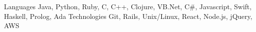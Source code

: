 \begin{cvskills}
  \cvskill
    {Languages}
    {Java, Python, Ruby, C, C++, Clojure, VB.Net, C\#, Javascript, Swift, Haskell, Prolog, Ada}
   \cvskill
    {Technologies}
    {Git, Rails, Unix/Linux, React, Node.js, jQuery, AWS}
\end{cvskills}
